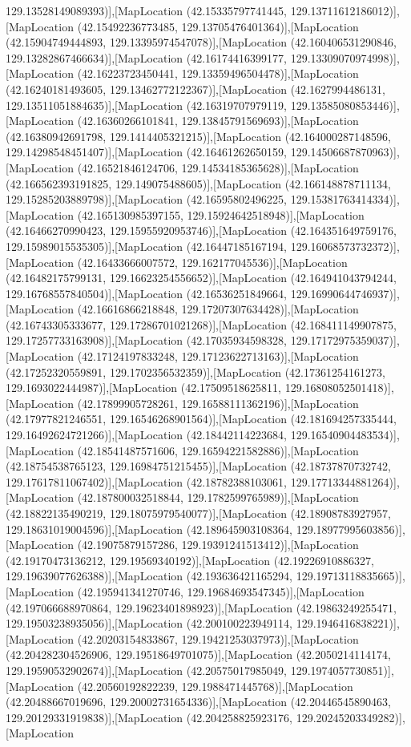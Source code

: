 129.13528149089393)],[MapLocation (42.15335797741445, 129.13711612186012)],[MapLocation (42.15492236773485, 129.13705476401364)],[MapLocation (42.15904749444893, 129.13395974547078)],[MapLocation (42.160406531290846, 129.13282867466634)],[MapLocation (42.16174416399177, 129.13309070974998)],[MapLocation (42.16223723450441, 129.13359496504478)],[MapLocation (42.16240181493605, 129.13462772122367)],[MapLocation (42.1627994486131, 129.13511051884635)],[MapLocation (42.16319707979119, 129.13585080853446)],[MapLocation (42.16360266101841, 129.13845791569693)],[MapLocation (42.16380942691798, 129.1414405321215)],[MapLocation (42.164000287148596, 129.14298548451407)],[MapLocation (42.16461262650159, 129.14506687870963)],[MapLocation (42.16521846124706, 129.14534185365628)],[MapLocation (42.166562393191825, 129.149075488605)],[MapLocation (42.166148878711134, 129.15285203889798)],[MapLocation (42.16595802496225, 129.15381763414334)],[MapLocation (42.165130985397155, 129.15924642518948)],[MapLocation (42.16466270990423, 129.15955920953746)],[MapLocation (42.164351649759176, 129.15989015535305)],[MapLocation (42.16447185167194, 129.16068573732372)],[MapLocation (42.16433666007572, 129.162177045536)],[MapLocation (42.16482175799131, 129.16623254556652)],[MapLocation (42.164941043794244, 129.16768557840504)],[MapLocation (42.16536251849664, 129.16990644746937)],[MapLocation (42.16616866218848, 129.17207307634428)],[MapLocation (42.16743305333677, 129.17286701021268)],[MapLocation (42.168411149907875, 129.17257733163908)],[MapLocation (42.17035934598328, 129.17172975359037)],[MapLocation (42.17124197833248, 129.17123622713163)],[MapLocation (42.17252320559891, 129.1702356532359)],[MapLocation (42.17361254161273, 129.1693022444987)],[MapLocation (42.17509518625811, 129.16808052501418)],[MapLocation (42.17899905728261, 129.16588111362196)],[MapLocation (42.17977821246551, 129.16546268901564)],[MapLocation (42.181694257335444, 129.16492624721266)],[MapLocation (42.18442114223684, 129.16540904483534)],[MapLocation (42.18541487571606, 129.16594221582886)],[MapLocation (42.18754538765123, 129.16984751215455)],[MapLocation (42.18737870732742, 129.17617811067402)],[MapLocation (42.18782388103061, 129.17713344881264)],[MapLocation (42.187800032518844, 129.1782599765989)],[MapLocation (42.18822135490219, 129.18075979540077)],[MapLocation (42.18908783927957, 129.18631019004596)],[MapLocation (42.189645903108364, 129.18977995603856)],[MapLocation (42.19075879157286, 129.19391241513412)],[MapLocation (42.19170473136212, 129.19569340192)],[MapLocation (42.19226910886327, 129.19639077626388)],[MapLocation (42.193636421165294, 129.19713118835665)],[MapLocation (42.195941341270746, 129.19684693547345)],[MapLocation (42.197066688970864, 129.19623401898923)],[MapLocation (42.19863249255471, 129.19503238935056)],[MapLocation (42.200100223949114, 129.1946416838221)],[MapLocation (42.20203154833867, 129.19421253037973)],[MapLocation (42.204282304526906, 129.19518649701075)],[MapLocation (42.2050214114174, 129.19590532902674)],[MapLocation (42.20575017985049, 129.1974057730851)],[MapLocation (42.20560192822239, 129.1988471445768)],[MapLocation (42.20488667019696, 129.20002731654336)],[MapLocation (42.20446545890463, 129.20129331919838)],[MapLocation (42.204258825923176, 129.20245203349282)],[MapLocation 